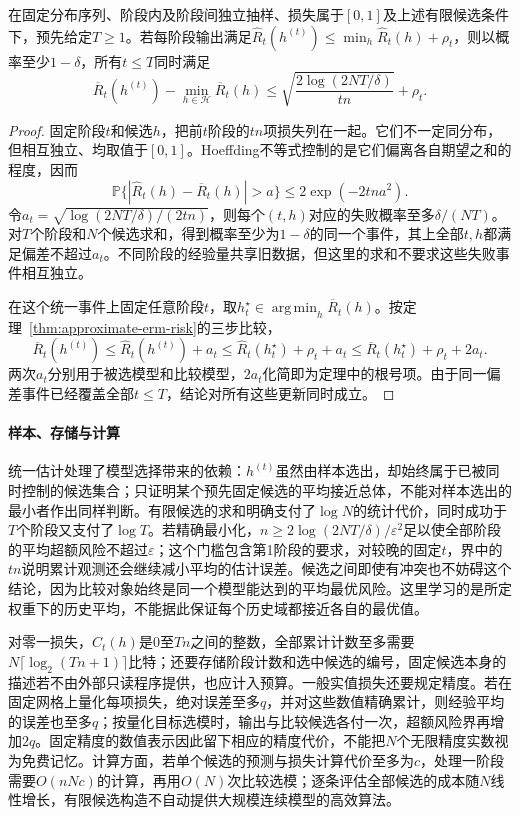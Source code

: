 \begin{theorem}[累计损失学习的历史平均保证]
\label{thm:continual-average-finite}
在固定分布序列、阶段内及阶段间独立抽样、损失属于$[0,1]$及上述有限候选条件下，预先给定$T\geq1$。若每阶段输出满足$\widehat R_t(h^{(t)})\leq\min_h\widehat R_t(h)+\rho_t$，则以概率至少$1-\delta$，所有$t\leq T$同时满足
\begin{equation}
 \overline R_t(h^{(t)})-\min_{h\in\mathcal H}\overline R_t(h)
 \leq\sqrt{\frac{2\log(2NT/\delta)}{tn}}+\rho_t .
 \label{eq:continual-average-bound}
\end{equation}
\end{theorem}
\begin{proof}
固定阶段$t$和候选$h$，把前$t$阶段的$tn$项损失列在一起。它们不一定同分布，但相互独立、均取值于$[0,1]$。Hoeffding不等式控制的是它们偏离各自期望之和的程度，因而
\[
 \mathbb P\{|\widehat R_t(h)-\overline R_t(h)|>a\}\leq2\exp(-2tna^2).
\]
令$a_t=\sqrt{\log(2NT/\delta)/(2tn)}$，则每个$(t,h)$对应的失败概率至多$\delta/(NT)$。对$T$个阶段和$N$个候选求和，得到概率至少为$1-\delta$的同一个事件，其上全部$t,h$都满足偏差不超过$a_t$。不同阶段的经验量共享旧数据，但这里的求和不要求这些失败事件相互独立。

在这个统一事件上固定任意阶段$t$，取$h_t^\star\in\operatorname*{arg\,min}_h\overline R_t(h)$。按定理~\ref{thm:approximate-erm-risk}的三步比较，
\[
 \overline R_t(h^{(t)})\leq\widehat R_t(h^{(t)})+a_t
 \leq\widehat R_t(h_t^\star)+\rho_t+a_t
 \leq\overline R_t(h_t^\star)+\rho_t+2a_t .
\]
两次$a_t$分别用于被选模型和比较模型，$2a_t$化简即为定理中的根号项。由于同一偏差事件已经覆盖全部$t\leq T$，结论对所有这些更新同时成立。
\end{proof}
\paragraph{样本、存储与计算}
统一估计处理了模型选择带来的依赖：$h^{(t)}$虽然由样本选出，却始终属于已被同时控制的候选集合；只证明某个预先固定候选的平均接近总体，不能对样本选出的最小者作出同样判断。有限候选的求和明确支付了$\log N$的统计代价，同时成功于$T$个阶段又支付了$\log T$。若精确最小化，$n\geq2\log(2NT/\delta)/\varepsilon^2$足以使全部阶段的平均超额风险不超过$\varepsilon$；这个门槛包含第1阶段的要求，对较晚的固定$t$，界中的$tn$说明累计观测还会继续减小平均的估计误差。候选之间即使有冲突也不妨碍这个结论，因为比较对象始终是同一个模型能达到的平均最优风险。这里学习的是所定权重下的历史平均，不能据此保证每个历史域都接近各自的最优值。

对零一损失，$C_t(h)$是0至$Tn$之间的整数，全部累计计数至多需要$N\lceil\log_2(Tn+1)\rceil$比特；还要存储阶段计数和选中候选的编号，固定候选本身的描述若不由外部只读程序提供，也应计入预算。一般实值损失还要规定精度。若在固定网格上量化每项损失，绝对误差至多$q$，并对这些数值精确累计，则经验平均的误差也至多$q$；按量化目标选模时，输出与比较候选各付一次，超额风险界再增加$2q$。固定精度的数值表示因此留下相应的精度代价，不能把$N$个无限精度实数视为免费记忆。计算方面，若单个候选的预测与损失计算代价至多为$c$，处理一阶段需要$O(nNc)$的计算，再用$O(N)$次比较选模；逐条评估全部候选的成本随$N$线性增长，有限候选构造不自动提供大规模连续模型的高效算法。


